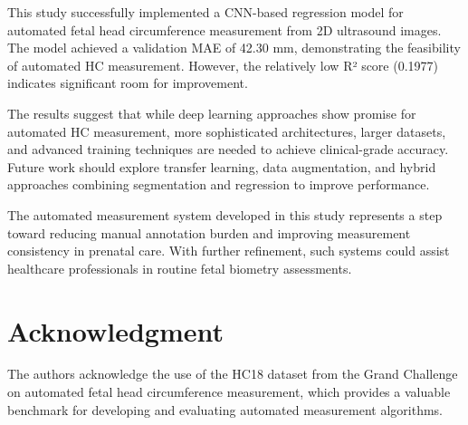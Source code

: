 \documentclass[conference]{IEEEtran}
\begin{document}
This study successfully implemented a CNN-based regression model for automated fetal head circumference measurement from 2D ultrasound images. The model achieved a validation MAE of 42.30 mm, demonstrating the feasibility of automated HC measurement. However, the relatively low R² score (0.1977) indicates significant room for improvement.

The results suggest that while deep learning approaches show promise for automated HC measurement, more sophisticated architectures, larger datasets, and advanced training techniques are needed to achieve clinical-grade accuracy. Future work should explore transfer learning, data augmentation, and hybrid approaches combining segmentation and regression to improve performance.

The automated measurement system developed in this study represents a step toward reducing manual annotation burden and improving measurement consistency in prenatal care. With further refinement, such systems could assist healthcare professionals in routine fetal biometry assessments.

\section*{Acknowledgment}

The authors acknowledge the use of the HC18 dataset from the Grand Challenge on automated fetal head circumference measurement, which provides a valuable benchmark for developing and evaluating automated measurement algorithms.
\end{document}
